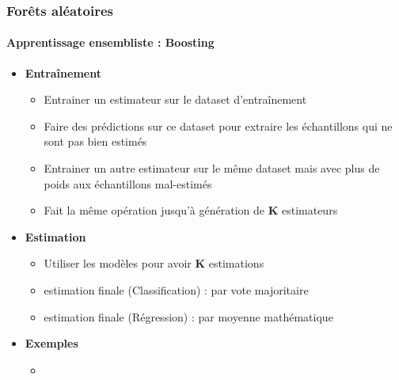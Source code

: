 \documentclass[xcolor=table]{beamer}
\begin{document}
\begin{frame}
	\frametitle{Forêts aléatoires}
	\framesubtitle{Apprentissage ensembliste : Boosting}
	
	\begin{itemize}
		\item \textbf{Entraînement}
		\begin{itemize}
			\item Entrainer un estimateur sur le dataset d'entraînement
			\item Faire des prédictions sur ce dataset pour extraire les échantillons qui ne sont pas bien estimés
			\item Entrainer un autre estimateur sur le même dataset mais avec plus de poids aux échantillons mal-estimés
			\item Fait la même opération jusqu'à génération de \textbf{K} estimateurs
		\end{itemize}
		\item \textbf{Estimation}
		\begin{itemize}
			\item Utiliser les modèles pour avoir \textbf{K} estimations
			\item estimation finale (Classification) : par vote majoritaire
			\item estimation finale (Régression) : par moyenne mathématique
		\end{itemize}
		\item \textbf{Exemples}
		\begin{itemize}
			\item {}
		\end{itemize}
	\end{itemize}
	
\end{frame}
\end{document}
